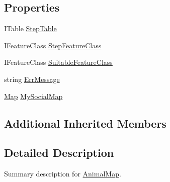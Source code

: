 \subsection*{Properties}
\begin{DoxyCompactItemize}
\item 
I\-Table \hyperlink{class_s_e_a_r_c_h_1_1_animal_map_a12649a5f19bffabf46302dc8e1b6f534}{Step\-Table}
\item 
I\-Feature\-Class \hyperlink{class_s_e_a_r_c_h_1_1_animal_map_a2b6854c8e39aeb885a75cee316ef172b}{Step\-Feature\-Class}
\item 
I\-Feature\-Class \hyperlink{class_s_e_a_r_c_h_1_1_animal_map_a5a6d17ff0edb0d49d9b687bb9cceadc0}{Suitable\-Feature\-Class}
\item 
string \hyperlink{class_s_e_a_r_c_h_1_1_animal_map_a3078ba4a94c24d435458cc88d34983a3}{Err\-Message}
\item 
\hyperlink{class_s_e_a_r_c_h_1_1_map}{Map} \hyperlink{class_s_e_a_r_c_h_1_1_animal_map_a1a2a7f3b8b78337a9e1d8210ae31f71f}{My\-Social\-Map}
\end{DoxyCompactItemize}
\subsection*{Additional Inherited Members}


\subsection{Detailed Description}
Summary description for \hyperlink{class_s_e_a_r_c_h_1_1_animal_map}{Animal\-Map}. 



